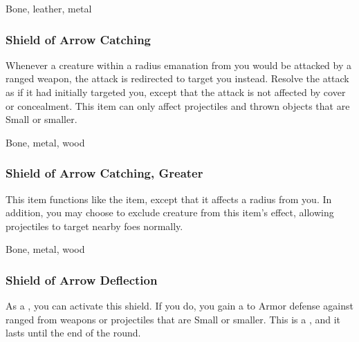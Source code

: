  


 Bone, leather, metal


\lowercase{\hypertarget{item:Shield of Arrow Catching}{}}\label{item:Shield of Arrow Catching}
\hypertarget{item:Shield of Arrow Catching}{\subsubsection{Shield of Arrow Catching\hfill{}}}

Whenever a creature within a \areamed radius emanation from you would be attacked by a ranged weapon, the attack is redirected to target you instead.
Resolve the attack as if it had initially targeted you, except that the attack is not affected by cover or concealment.
This item can only affect projectiles and thrown objects that are Small or smaller.



 


 Bone, metal, wood


\lowercase{\hypertarget{item:Shield of Arrow Catching, Greater}{}}\label{item:Shield of Arrow Catching, Greater}
\hypertarget{item:Shield of Arrow Catching, Greater}{\subsubsection{Shield of Arrow Catching, Greater\hfill{}}}

This item functions like the  item, except that it affects a \arealarge radius from you.
In addition, you may choose to exclude creature from this item's effect, allowing projectiles to target nearby foes normally.



 


 Bone, metal, wood


\lowercase{\hypertarget{item:Shield of Arrow Deflection}{}}\label{item:Shield of Arrow Deflection}
\hypertarget{item:Shield of Arrow Deflection}{\subsubsection{Shield of Arrow Deflection\hfill{}}}

As a , you can activate this shield.
If you do, you gain a   to Armor defense against ranged  from weapons or projectiles that are Small or smaller.
This is a , and it lasts until the end of the round.



